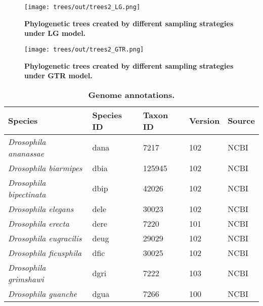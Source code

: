 \documentclass[10pt,letterpaper]{article}
\begin{document}
\begin{figure}[h!]
\texttt{[image: trees/out/trees2\_LG.png]}
\centering
\caption{\textbf{Phylogenetic trees created by different sampling strategies under LG model.}}
\label{sfig:trees_LG}
\end{figure}

\begin{figure}[h!]
\texttt{[image: trees/out/trees2\_GTR.png]}
\centering
\caption{\textbf{Phylogenetic trees created by different sampling strategies under GTR model.}}
\label{sfig:trees_GTR}
\end{figure}

\setcounter{table}{0}
\renewcommand{\thetable}{S\arabic{table}}

\begin{table}[h!]
\centering
\caption{\textbf{Genome annotations.}}
\begin{tabular}{|l|l|l|l|l|}
\hline
\textbf{Species}                       & \textbf{Species ID} & \textbf{Taxon ID} & \textbf{Version} & \textbf{Source} \\ \hline
\textit{Drosophila ananassae}          & dana                & 7217              & 102              & NCBI            \\ \hline
\textit{Drosophila biarmipes}          & dbia                & 125945            & 102              & NCBI            \\ \hline
\textit{Drosophila bipectinata}        & dbip                & 42026             & 102              & NCBI            \\ \hline
\textit{Drosophila elegans}            & dele                & 30023             & 102              & NCBI            \\ \hline
\textit{Drosophila erecta}             & dere                & 7220              & 101              & NCBI            \\ \hline
\textit{Drosophila eugracilis}         & deug                & 29029             & 102              & NCBI            \\ \hline
\textit{Drosophila ficusphila}         & dfic                & 30025             & 102              & NCBI            \\ \hline
\textit{Drosophila grimshawi}          & dgri                & 7222              & 103              & NCBI            \\ \hline
\textit{Drosophila guanche}            & dgua                & 7266              & 100              & NCBI            \\ \hline

\end{tabular}
\end{table}
\end{document}
